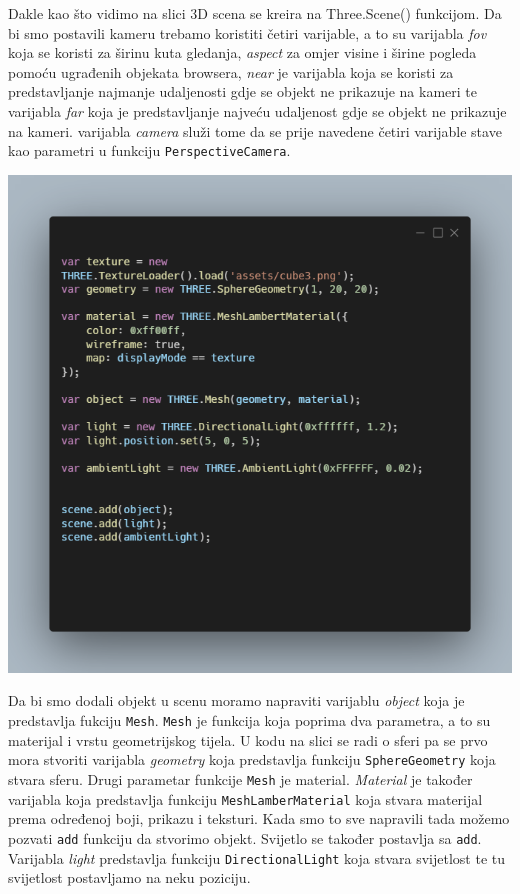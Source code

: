 \documentclass[a4paper,12pt]{article}
\begin{document}
Dakle kao što vidimo na slici 3D scena se kreira na Three.Scene() funkcijom. Da bi smo postavili kameru trebamo koristiti četiri varijable, a to su 
varijabla \textit{fov} koja se koristi za širinu kuta gledanja, \textit{aspect} za omjer visine i širine pogleda pomoću ugrađenih objekata browsera, \textit{near} je 
varijabla koja se koristi za predstavljanje najmanje udaljenosti gdje se objekt ne prikazuje na kameri te varijabla \textit{far} koja je predstavljanje najveću 
udaljenost gdje se objekt ne prikazuje na kameri.
varijabla \textit{camera} služi tome da se prije navedene četiri varijable stave kao parametri u funkciju \texttt{PerspectiveCamera}.

\begin{center}
    \includegraphics[scale=0.5]{image/zadatak1_objekti.png}
\end{center}
Da bi smo dodali objekt u scenu moramo napraviti varijablu \textit{object} koja je predstavlja fukciju \texttt{Mesh}. \texttt{Mesh} je funkcija koja poprima dva parametra, a to su materijal i 
vrstu geometrijskog tijela. U kodu na slici se radi o sferi pa se prvo mora stvoriti varijabla \textit{geometry} koja predstavlja funkciju \texttt{SphereGeometry} koja stvara sferu.
Drugi parametar funkcije \texttt{Mesh} je material. \textit{Material} je također varijabla koja predstavlja funkciju \texttt{MeshLamberMaterial} koja stvara materijal prema određenoj boji, 
prikazu i teksturi. Kada smo to sve napravili tada možemo pozvati \texttt{add} funkciju da stvorimo objekt. Svijetlo  se također postavlja sa \texttt{add}.
Varijabla \textit{light} predstavlja funkciju \texttt{DirectionalLight} koja stvara svijetlost te tu svijetlost postavljamo na neku poziciju. 
\end{document}

